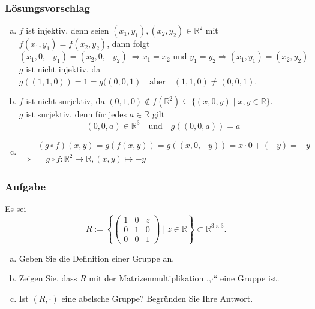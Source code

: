 \documentclass[a4paper,11pt]{scrartcl}
\newcounter{auf}
\newcommand{\Aufgabe}%
        {\addtocounter{auf}{1} \subsubsection*{\rmfamily  Aufgabe \theauf \hspace{1em}} }
\newcommand{\RR}{\mathbb{R}}
\begin{document}
\subsubsection*{Lösungsvorschlag}
\begin{enumerate}[a)]

\item $f$ ist injektiv, denn seien $(x_1,y_1),(x_2,y_2) \in \RR^2$ mit $f(x_1,y_1)=f(x_2,y_2)$, dann folgt
$$
(x_1,0,-y_1)=(x_2,0,-y_2) \ \Rightarrow x_1=x_2 \text{ und } y_1=y_2 \Rightarrow (x_1,y_1)=(x_2,y_2)
$$
$g$ ist nicht injektiv, da $g((1,1,0))=1=g((0,0,1) \quad \text{aber} \quad (1,1,0) \ne (0,0,1)$.
\item $f$ ist nicht surjektiv, da $(0,1,0) \notin f(\RR^2) \subseteq \{(x,0,y)\mid x,y \in \RR\} $.\\
$g$ ist surjektiv, denn für jedes $a \in \RR$ gilt
$$
(0,0,a) \in \RR^3 \quad \text{und} \quad g((0,0,a))=a
$$
\item
\begin{align*}
&(g\circ f)(x,y)=g(f(x,y))=g((x,0,-y))=x\cdot 0 +(-y)=-y\\
\Rightarrow&\quad g\circ f :\RR^2 \to \RR, (x,y) \mapsto -y
\end{align*}
\end{enumerate}



\newpage
\Aufgabe
Es sei 
$$
R:=\left\{\begin{pmatrix} 1&0&z\\0&1&0\\0&0&1 \end{pmatrix} \mid z \in \RR \right\} \subset \RR^{3\times 3}.
$$
\begin{enumerate}[a)]
\item Geben Sie die Definition einer Gruppe an.

\item Zeigen Sie, dass $R$ mit der Matrizenmultiplikation ,,$\cdot$`` eine Gruppe ist.

\item Ist $(R,\cdot)$ eine abelsche Gruppe? Begründen Sie Ihre Antwort.

\end{enumerate}

%
%
\end{document}
